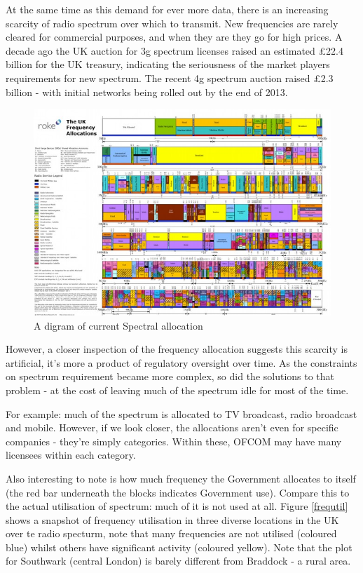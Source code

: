 \documentclass[conference]{IEEEtran}
\begin{document}
At the same time as this demand for ever more data, there is an increasing scarcity of radio spectrum over which to transmit. New frequencies are rarely cleared for commercial purposes, and when they are they go for high prices.  A decade ago the UK auction for 3g spectrum licenses raised an estimated £22.4 billion \cite{Ukmobil} for the UK treasury, indicating the seriousness of the market players requirements for new spectrum. The recent 4g spectrum auction raised £2.3 billion \cite{BBC News}- with initial networks being rolled out by the end of 2013.

\begin{figure}[h]
\centering
\includegraphics[height = 7 cm]{uk-spectrum-allocation-chart1-640x445.jpg}
\caption{A digram of current Spectral allocation \cite{Strategy2013}}
\label{spectrumalloc}
\end{figure}

However, a closer inspection of the frequency allocation suggests this scarcity is artificial, it's more a product of regulatory oversight over time. As the constraints on spectrum requirement became more complex, so did the solutions to that problem - at the cost of leaving much of the spectrum idle for most of the time. 

For example: much of the spectrum is allocated to TV broadcast, radio broadcast and mobile. However, if we look closer, the allocations aren't even for specific companies - they're simply categories. Within these, OFCOM may have many licensees within each category.

Also interesting to note is how much frequency the Government allocates to itself (the red bar underneath the blocks indicates Government use). Compare this to the actual utilisation of spectrum: much of it is not used at all. Figure \ref{frequtil} shows a snapshot of frequency utilisation in three diverse locations in the UK over te radio specturm, note that many frequencies are not utilised (coloured blue) whilst others have significant activity (coloured yellow). Note that the plot for Southwark (central London) is barely different from Braddock - a rural area. 
\end{document}
